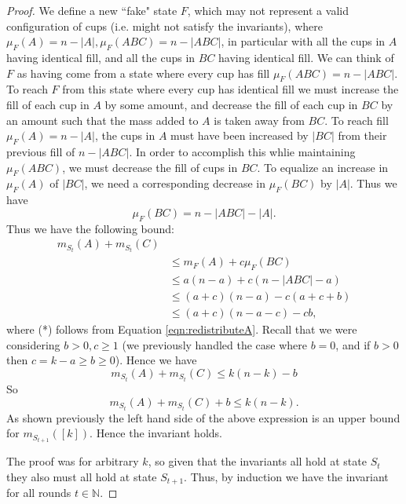 \documentclass[twocolumn]{article}[10pt]
\begin{document}
\begin{proof}
We define a new ``fake" state $F$, which may not represent
a valid configuration of cups (i.e. might not satisfy the invariants), where
$\mu_F(A)=n-|A|, \mu_F(ABC)=n-|ABC|$, in particular with all the cups in $A$
having identical fill, and all the cups in $BC$ having identical fill.
We can think of $F$ as having come from a state where every cup has fill
$\mu_F(ABC) = n-|ABC|$. To reach $F$ from this state where every cup has
identical fill we must increase the fill of each cup in $A$ by some amount, and
decrease the fill of each cup in $BC$ by an amount such that the mass added to
$A$ is taken away from $BC$. To reach fill $\mu_F(A) = n-|A|$, the cups in $A$
must have been increased by $|BC|$ from their previous fill of $n-|ABC|$.
In order to accomplish this whlie maintaining $\mu_{F}(ABC)$, we must decrease the fill of cups in $BC$. 
To equalize an increase in $\mu_{F}(A)$ of $|BC|$, we need a corresponding decrease in $\mu_{F}(BC)$ by $|A|$.
Thus we have $$\mu_{F}(BC) = n-|ABC|-|A|.$$
Thus we have the following bound:
\begin{align*}
  m_{S_t}(A) + m_{S_t}(C)& \\
&\le m_{F}(A) + c\mu_{F}(BC) \tag{*}\\
&\le a(n-a) + c(n-|ABC|-a) \\
&\le (a+c)(n-a) - c(a+c+b) \\
&\le (a+c)(n-a-c) - cb,
\end{align*}
where (*) follows from Equation \ref{eqn:redistributeA}.
Recall that we were considering $b> 0, c \ge 1$ (we previously handled the case
where $b=0$, and if $b>0$ then $c=k-a\ge b\ge 0$).
Hence we have 
$$m_{S_t}(A) + m_{S_t}(C) \le k(n-k) -b$$
So 
$$m_{S_t}(A) + m_{S_t}(C)+b \le k(n-k).$$
As shown previously the left hand side of the above expression is an upper bound for $m_{S_{t+1}}([k])$.
Hence the invariant holds.

The proof was for arbitrary $k$, so given that the invariants all hold at state
$S_t$ they also must all hold at state $S_{t+1}$.
Thus, by induction we have the invariant for all rounds $t\in\mathbb{N}$.
\end{proof}
\end{document}
